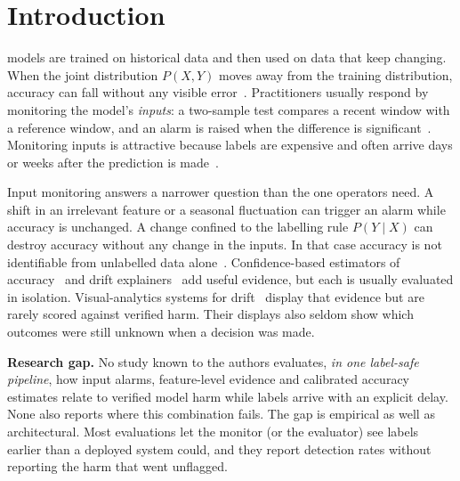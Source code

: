 \section{Introduction}
\label{sec:intro}

 models are trained on historical data and then used
on data that keep changing. When the joint distribution $P(X,Y)$ moves away from the
training distribution, accuracy can fall without any visible error~\cite{gama2014survey,lu2019learning,webb2016characterizing}.
Practitioners usually respond by monitoring the model's \emph{inputs}: a
two-sample test compares a recent window with a reference window, and an alarm is
raised when the difference is significant~\cite{rabanser2019failing,gretton2012kernel,lukats2025benchmark}.
Monitoring inputs is attractive because labels are expensive and often arrive days or
weeks after the prediction is made~\cite{grzenda2020delayed,zliobaite2010change}.

Input monitoring answers a narrower question than the one operators need. A shift in
an irrelevant feature or a seasonal fluctuation can trigger an alarm while accuracy is
unchanged. A change confined to the labelling rule $P(Y\mid X)$ can destroy accuracy
without any change in the inputs. In that case accuracy is not identifiable from
unlabelled data alone~\cite{bayram2022concept,lipton2018detecting}. Confidence-based
estimators of accuracy~\cite{garg2022atc,guillory2021predicting,kivimaki2025confidence}
and drift explainers~\cite{hinder2024surveyB,szucs2025dde} add useful evidence, but
each is usually evaluated in isolation. Visual-analytics systems for drift~\cite{yang2020driftvis,wang2020conceptexplorer}
display that evidence but are rarely scored against verified harm. Their displays also
seldom show which outcomes were still unknown when a decision was made.

\textbf{Research gap.} No study known to the authors evaluates, \emph{in one
label-safe pipeline}, how input alarms, feature-level evidence and calibrated accuracy
estimates relate to verified model harm while labels arrive with an explicit delay.
None also reports where this combination fails. The gap is empirical as well as
architectural. Most evaluations let the monitor (or the evaluator) see labels
earlier than a deployed system could, and they report detection rates without
reporting the harm that went unflagged.


